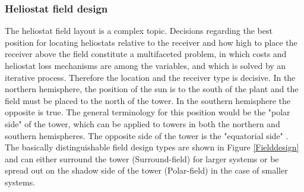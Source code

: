 \documentclass[Master,MEE,english]{twbook}%
\begin{document}
\subsubsection{Heliostat field design}
The heliostat field layout is a complex topic. Decisions regarding the best position for locating heliostats relative to the receiver and how high to place the receiver above the field constitute a multifaceted problem, in which costs and heliostat loss mechanisms are among the variables, and which is solved by an iterative process. Therefore the location and the receiver type is decisive. In the northern hemisphere, the position of the sun is to the south of the plant and the field must be placed to the north of the tower. In the southern hemisphere the opposite is true. The general terminology for this position would be the "polar side" of the tower, which can be applied to towers in both the northern and southern hemispheres. The opposite side of the tower is the
"equatorial side" \cite{Alexopoulos2013}. The basically distinguishable field design types are shown in Figure \ref{Fielddesign} and can either surround the tower (Surround-field) for larger systems or be spread out on the shadow side of the tower (Polar-field) in the case of smaller systems.
\end{document}
